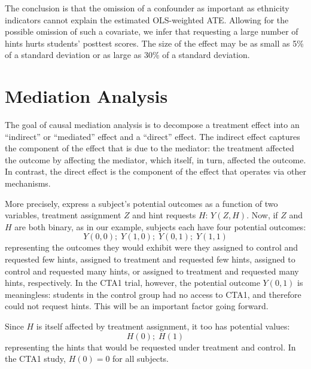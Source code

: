 \documentclass{article}\usepackage[]{graphicx}\usepackage[]{color}
\begin{document}
The conclusion is that the omission of a confounder as important as ethnicity indicators
cannot explain the estimated OLS-weighted ATE.
Allowing for the possible omission of such a covariate, we infer that requesting a
large number of hints hurts students' posttest scores.
The size of the effect may be as small as
5\% of a standard deviation
or as large as 30\% of a standard deviation.

\section{Mediation Analysis}\label{sec:mediation}
The goal of causal mediation analysis is to decompose a treatment
effect into an ``indirect'' or ``mediated''
effect and a ``direct'' effect.
The indirect effect captures the component of the effect that is due
to the mediator: the treatment affected the outcome by affecting the
mediator, which itself, in turn, affected the outcome.
In contrast, the direct effect is the component of the effect that
operates via other mechanisms.

More precisely, express a subject's potential outcomes as a function
of two variables, treatment assignment $Z$ and hint requests $H$:
$Y(Z,H)$.
Now, if $Z$ and $H$ are both binary, as in our example, subjects
each have four potential outcomes:
\begin{equation*}
Y(0,0);\;Y(1,0);\;Y(0,1);\;Y(1,1)
\end{equation*}
representing the outcomes they would exhibit were they assigned to
control and requested few hints, assigned to
treatment and requested few hints, assigned to control and requested
many hints, or assigned to treatment and requested many hints, respectively.
In the CTA1 trial, however, the potential outcome $Y(0,1)$ is
meaningless: students in the control group had no access to CTA1, and
therefore could not request hints.
This will be an important factor going forward.

Since $H$ is itself affected by treatment assignment, it
too has potential values:
\begin{equation*}
H(0);\;H(1)
\end{equation*}
representing the hints that would be requested under treatment and
control.
In the CTA1 study, $H(0)=0$ for all subjects.
\end{document}

